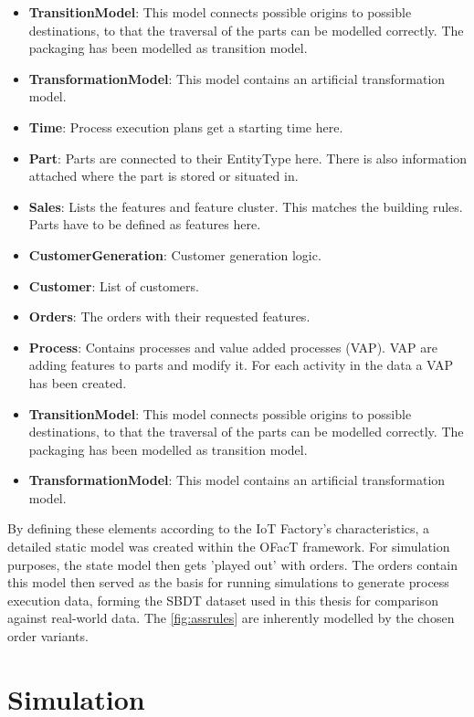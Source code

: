 \begin{itemize}
  \item \textbf{TransitionModel}: This model connects possible origins to possible destinations, to that the traversal of the parts can be modelled correctly. The packaging has been modelled as transition model.
  \item \textbf{TransformationModel}: This model contains an artificial transformation model.
  \item \textbf{Time}: Process execution plans get a starting time here.
  \item \textbf{Part}: Parts are connected to their EntityType here. There is also information attached where the part is stored or situated in.
  \item \textbf{Sales}: Lists the features and feature cluster. This matches the building rules. Parts have to be defined as features here.
  \item \textbf{CustomerGeneration}: Customer generation logic.
  \item \textbf{Customer}: List of customers.
  \item \textbf{Orders}: The orders with their requested features.
  \item \textbf{Process}: Contains processes and value added processes (VAP). VAP are adding features to parts and modify it. For each activity in the data a VAP has been created.
  \item \textbf{TransitionModel}: This model connects possible origins to possible destinations, to that the traversal of the parts can be modelled correctly. The packaging has been modelled as transition model.
  \item \textbf{TransformationModel}: This model contains an artificial transformation model.
\end{itemize}


By defining these elements according to the IoT Factory's characteristics, a detailed static model was created within the OFacT framework. For simulation purposes, the state model then gets 'played out' with orders. The orders contain this model then served as the basis for running simulations to generate process execution data, forming the SBDT dataset used in this thesis for comparison against real-world data. The \autoref{fig:assrules} are inherently modelled by the chosen order variants.

\section{Simulation}

